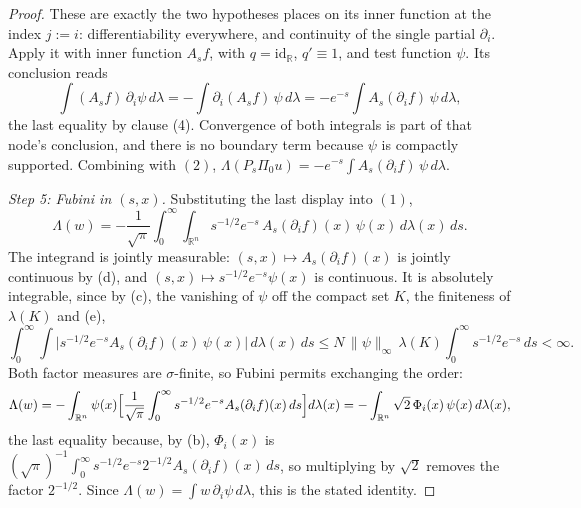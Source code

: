 \begin{proof}
These are exactly the two hypotheses  places on
its inner function at the index $j := i$: differentiability everywhere, and
continuity of the single partial $\partial_i$.  Apply it with inner function
$A_sf$, with $q = \mathrm{id}_{\mathbb{R}}$, $q' \equiv 1$, and test function
$\psi$.  Its conclusion reads
\[
  \int (A_sf)\,\partial_i\psi\,d\lambda
    = -\int \partial_i(A_sf)\,\psi\,d\lambda
    = -e^{-s}\int A_s(\partial_i f)\,\psi\,d\lambda ,
\]
the last equality by clause (4).  Convergence of both integrals is part of that
node's conclusion, and there is no boundary term because $\psi$ is compactly
supported.  Combining with $(2)$,
$\Lambda(P_s\Pi_0u) = -e^{-s}\int A_s(\partial_i f)\,\psi\,d\lambda$.

\emph{Step 5: Fubini in $(s,x)$.}
Substituting the last display into $(1)$,
\[
  \Lambda(w) = -\frac{1}{\sqrt\pi}\int_0^\infty\!\!\int_{\mathbb{R}^n}
      s^{-1/2}e^{-s}\,A_s(\partial_i f)(x)\,\psi(x)\,d\lambda(x)\,ds .
\]
The integrand is jointly measurable: $(s,x) \mapsto A_s(\partial_i f)(x)$ is
jointly continuous by (d), and $(s,x) \mapsto s^{-1/2}e^{-s}\psi(x)$ is
continuous.  It is absolutely integrable, since by (c), the vanishing of $\psi$
off the compact set $K$, the finiteness of $\lambda(K)$ and (e),
\[
  \int_0^\infty\!\!\int
      \bigl|s^{-1/2}e^{-s}A_s(\partial_i f)(x)\,\psi(x)\bigr|\,d\lambda(x)\,ds
    \leq N\,\|\psi\|_\infty\,\lambda(K)\int_0^\infty s^{-1/2}e^{-s}\,ds
    < \infty .
\]
Both factor measures are $\sigma$-finite, so Fubini permits exchanging the order:
\[
  \Lambda(w) = -\int_{\mathbb{R}^n}\psi(x)
      \Bigl[\frac{1}{\sqrt\pi}\int_0^\infty s^{-1/2}e^{-s}
        A_s(\partial_i f)(x)\,ds\Bigr]d\lambda(x)
    = -\int_{\mathbb{R}^n} \sqrt2\,\Phi_i(x)\,\psi(x)\,d\lambda(x) ,
\]
the last equality because, by (b), $\Phi_i(x)$ is
$(\sqrt\pi)^{-1}\int_0^\infty s^{-1/2}e^{-s}2^{-1/2}A_s(\partial_i f)(x)\,ds$, so
multiplying by $\sqrt2$ removes the factor $2^{-1/2}$.  Since
$\Lambda(w) = \int w\,\partial_i\psi\,d\lambda$, this is the stated identity.
\end{proof}
